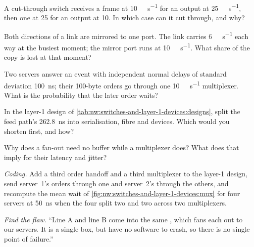 \begin{exercise}[$\star$]\label{exo:nw:switches-and-layer-1-devices:2}
A cut-through switch receives a frame at \qty{10}{\giga\bit\per\second} for an output at \qty{25}{\giga\bit\per\second}, then one at
25 for an output at 10. In which case can it cut through, and why?
\end{exercise}

\begin{exercise}[$\star$]\label{exo:nw:switches-and-layer-1-devices:3}
Both directions of a link are mirrored to one port. The link carries \qty{6}{\giga\bit\per\second} each way at the busiest moment;
the mirror port runs at \qty{10}{\giga\bit\per\second}. What share of the copy is lost at that moment?
\end{exercise}

\begin{exercise}[$\star\star$]\label{exo:nw:switches-and-layer-1-devices:4}
Two servers answer an event with independent normal delays of standard deviation \qty{100}{\nano\second}; their 100-byte orders go
through one \qty{10}{\giga\bit\per\second} multiplexer. What is the probability that the later order waits?
\end{exercise}

\begin{exercise}[$\star\star$]\label{exo:nw:switches-and-layer-1-devices:5}
In the layer-1 design of \cref{tab:nw:switches-and-layer-1-devices:designs}, split the feed path's 262.8~ns into serialisation,
fibre and devices. Which would you shorten first, and how?
\end{exercise}

\begin{exercise}[$\star\star$]\label{exo:nw:switches-and-layer-1-devices:6}
Why does a fan-out need no buffer while a multiplexer does? What does that imply for their latency and jitter?
\end{exercise}

\begin{exercise}[$\star\star\star$]\label{exo:nw:switches-and-layer-1-devices:7}
\emph{Coding.} Add a third order handoff and a third multiplexer to the layer-1 design, send server~1's orders through one and
server~2's through the others, and recompute the mean wait of \cref{fig:nw:switches-and-layer-1-devices:mux} for four servers at
\qty{50}{\nano\second} when the four split two and two across two multiplexers.
\end{exercise}

\begin{exercise}[$\star\star\star$]\label{exo:nw:switches-and-layer-1-devices:8}
\emph{Find the flaw.} ``Line A and line B come into the same , which fans each out to our servers. It is a single box,
but  have no software to crash, so there is no single point of failure.''
\end{exercise}

